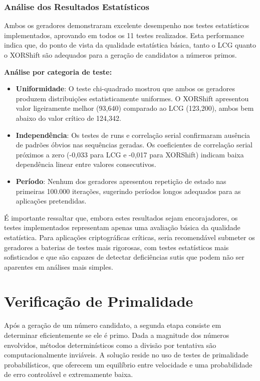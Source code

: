 \documentclass[a4paper, 11pt]{article}
\begin{document}
\subsubsection{Análise dos Resultados Estatísticos}

Ambos os geradores demonstraram excelente desempenho nos testes estatísticos
implementados, aprovando em todos os 11 testes realizados. Esta performance indica que,
do ponto de vista da qualidade estatística básica, tanto o LCG quanto o XORShift são
adequados para a geração de candidatos a números primos.

\textbf{Análise por categoria de teste:}

\begin{itemize}
    \item \textbf{Uniformidade}: O teste chi-quadrado mostrou que ambos os geradores
produzem distribuições estatisticamente uniformes. O XORShift apresentou valor
ligeiramente melhor (93,640) comparado ao LCG (123,200), ambos bem abaixo do valor
crítico de 124,342.

    \item \textbf{Independência}: Os testes de runs e correlação serial confirmaram
ausência de padrões óbvios nas sequências geradas. Os coeficientes de correlação serial
próximos a zero (-0,033 para LCG e -0,017 para XORShift) indicam baixa dependência
linear entre valores consecutivos.

    \item \textbf{Período}: Nenhum dos geradores apresentou repetição de estado nas
primeiras 100.000 iterações, sugerindo períodos longos adequados para as aplicações
pretendidas.
\end{itemize}

É importante ressaltar que, embora estes resultados sejam encorajadores, os testes
implementados representam apenas uma avaliação básica da qualidade estatística. Para
aplicações criptográficas críticas, seria recomendável submeter os geradores a baterias
de testes mais rigorosas, com testes estatísticos mais sofisticados e que
são capazes de detectar deficiências sutis que podem não ser aparentes em análises mais
simples.

\section{Verificação de Primalidade}

Após a geração de um número candidato, a segunda etapa consiste em determinar eficientemente se ele é primo. Dada a magnitude dos números envolvidos, métodos determinísticos como a divisão por tentativa são computacionalmente inviáveis. A solução reside no uso de testes de primalidade probabilísticos, que oferecem um equilíbrio entre velocidade e uma probabilidade de erro controlável e extremamente baixa.
\end{document}
